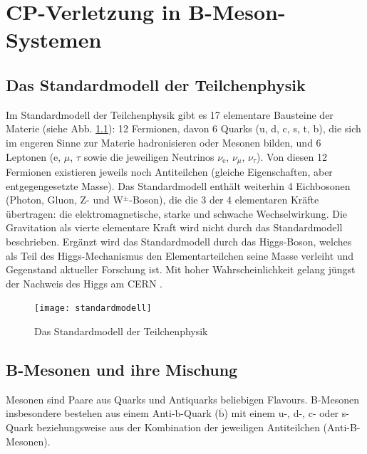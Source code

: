 \chapter{CP-Verletzung in B-Meson-Systemen} \label{kap_cp-verletzung}

\section{Das Standardmodell der Teilchenphysik}
Im Standardmodell der Teilchenphysik gibt es 17 elementare Bausteine der Materie (siehe Abb. \ref{fig:standardmodell}): 12 Fermionen, davon 6 Quarks (u, d, c, s, t, b), die sich im engeren Sinne zur Materie hadronisieren oder Mesonen bilden, und 6 Leptonen (e, $\mu$, $\tau$ sowie die jeweiligen Neutrinos $\nu_{\text{e}}$, $\nu_{\mu}$, $\nu_{\tau}$). Von diesen 12 Fermionen existieren jeweils noch Antiteilchen (gleiche Eigenschaften, aber entgegengesetzte Masse). Das Standardmodell enthält weiterhin 4 Eichbosonen (Photon, Gluon, Z- und W$^{\pm}$-Boson), die die 3 der 4 elementaren Kräfte übertragen: die elektromagnetische, starke und schwache Wechselwirkung. Die Gravitation als vierte elementare Kraft wird nicht durch das Standardmodell beschrieben. Ergänzt wird das Standardmodell durch das Higgs-Boson, welches als Teil des Higgs-Mechanismus den Elementarteilchen seine Masse verleiht und Gegenstand aktueller Forschung ist. Mit hoher Wahrscheinlichkeit gelang jüngst der Nachweis des Higgs am CERN \cite{higgs}.

\begin{figure}[hptb]
\centering
\texttt{[image: standardmodell]}
\caption{Das Standardmodell der Teilchenphysik \cite{wiki_standard}}
\label{fig:standardmodell}
\end{figure}

\section{B-Mesonen und ihre Mischung}
Mesonen sind Paare aus Quarks und Antiquarks beliebigen Flavours. B-Mesonen insbesondere bestehen aus einem Anti-b-Quark ($\mathrm{\overline{b}}$) mit einem u-, d-, c- oder s-Quark beziehungsweise aus der Kombination der jeweiligen Antiteilchen (Anti-B-Mesonen).

